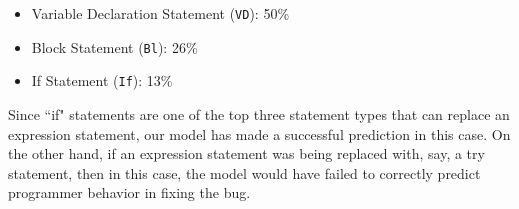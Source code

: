 \begin{itemize}
  \item Variable Declaration Statement (\texttt{VD}): 50\%
  \item Block Statement (\texttt{Bl}): 26\%
  \item If Statement (\texttt{If}): 13\%
\end{itemize}

Since ``if" statements are one of the top three statement types that can replace an expression statement, our model has made a successful prediction in this case. On the other hand, if an expression statement was being replaced with, say, a try statement, then in this case, the model would have failed to correctly predict programmer behavior in fixing the bug.





